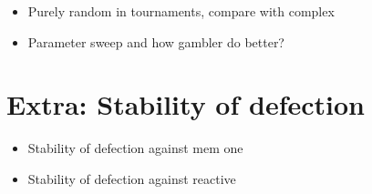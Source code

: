 \documentclass[10pt]{article}
\begin{document}
\begin{itemize}
    \item Purely random in tournaments, compare with complex
    \item Parameter sweep and how gambler do better?
\end{itemize}

\section{Extra: Stability of defection}

\begin{itemize}
    \item Stability of defection against mem one
    \item Stability of defection against reactive
\end{itemize}




\end{document}
